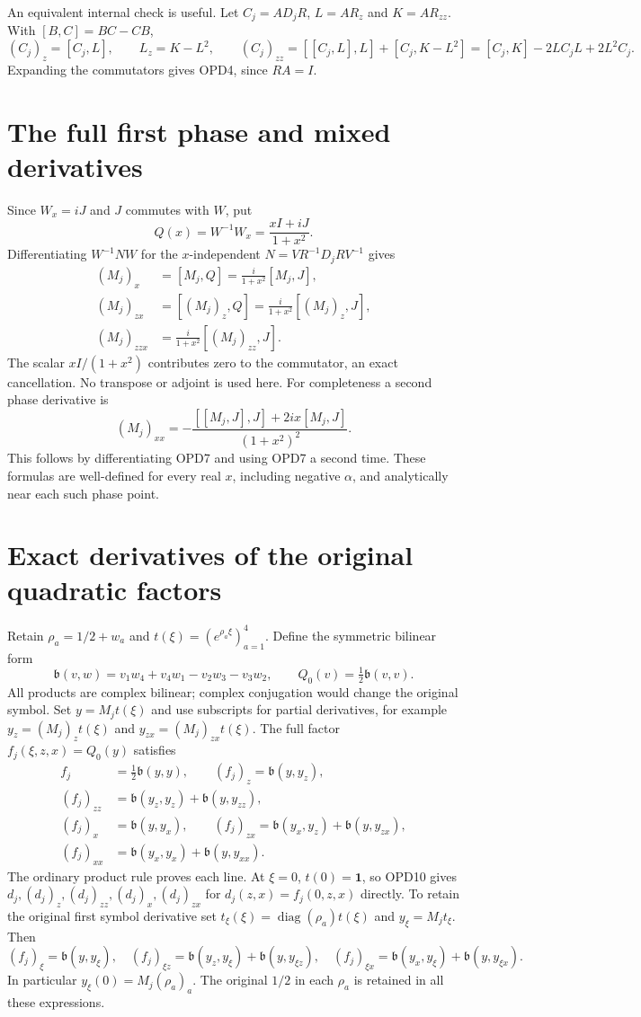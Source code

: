 \documentclass[11pt]{article}
\newcommand{\diag}{\operatorname{diag}}
\begin{document}
An equivalent internal check is useful. Let $C_j=AD_jR$,
$L=AR_z$ and $K=AR_{zz}$. With $[B,C]=BC-CB$,
\[
 (C_j)_z=[C_j,L],\qquad L_z=K-L^2,\qquad
 (C_j)_{zz}=[[C_j,L],L]+[C_j,K-L^2]
 =[C_j,K]-2LC_jL+2L^2C_j.
 \tag{OPD5}
\]
Expanding the commutators gives OPD4, since $RA=I$.

\section{The full first phase and mixed derivatives}
Since $W_x=iJ$ and $J$ commutes with $W$, put
\[
 Q(x)=W^{-1}W_x=\frac{xI+iJ}{1+x^2}.
 \tag{OPD6}
\]
Differentiating $W^{-1}NW$ for the $x$-independent
$N=VR^{-1}D_jRV^{-1}$ gives
\[
 \begin{split}
 (M_j)_x&=[M_j,Q]=\frac{i}{1+x^2}[M_j,J],\\
 (M_j)_{zx}&=[(M_j)_z,Q]
                =\frac{i}{1+x^2}[(M_j)_z,J],\\
 (M_j)_{zzx}&=\frac{i}{1+x^2}[(M_j)_{zz},J].
 \end{split}\tag{OPD7}
\]
The scalar $xI/(1+x^2)$ contributes zero to the commutator,
an exact cancellation. No transpose or adjoint is used here.
For completeness a second phase derivative is
\[
 (M_j)_{xx}=
 -\frac{[[M_j,J],J]+2ix[M_j,J]}{(1+x^2)^2}.
 \tag{OPD8}
\]
This follows by differentiating OPD7 and using OPD7 a second time.
These formulas are well-defined for every real $x$, including
negative $\alpha$, and analytically near each such phase point.

\section{Exact derivatives of the original quadratic factors}
Retain $\rho_a=1/2+w_a$ and $t(\xi)=(e^{\rho_a\xi})_{a=1}^4$.
Define the symmetric bilinear form
\[
 \mathfrak b(v,w)=v_1w_4+v_4w_1-v_2w_3-v_3w_2,
 \qquad Q_0(v)=\tfrac12\mathfrak b(v,v).
 \tag{OPD9}
\]
All products are complex bilinear; complex conjugation would change
the original symbol. Set $y=M_jt(\xi)$ and use subscripts for
partial derivatives, for example $y_z=(M_j)_zt(\xi)$ and
$y_{zx}=(M_j)_{zx}t(\xi)$. The full factor
$f_j(\xi,z,x)=Q_0(y)$ satisfies
\[
 \begin{split}
 f_j&=\tfrac12\mathfrak b(y,y),\qquad
 (f_j)_z=\mathfrak b(y,y_z),\\
 (f_j)_{zz}&=\mathfrak b(y_z,y_z)+\mathfrak b(y,y_{zz}),\\
 (f_j)_x&=\mathfrak b(y,y_x),\qquad
 (f_j)_{zx}=\mathfrak b(y_x,y_z)+\mathfrak b(y,y_{zx}),\\
 (f_j)_{xx}&=\mathfrak b(y_x,y_x)+\mathfrak b(y,y_{xx}).
 \end{split}\tag{OPD10}
\]
The ordinary product rule proves each line. At $\xi=0$,
$t(0)=\mathbf1$, so OPD10 gives $d_j,(d_j)_z,(d_j)_{zz},
(d_j)_x,(d_j)_{zx}$ for $d_j(z,x)=f_j(0,z,x)$ directly.
To retain the original first symbol derivative set
$t_\xi(\xi)=\diag(\rho_a)t(\xi)$ and $y_\xi=M_jt_\xi$.
Then
\[
 (f_j)_\xi=\mathfrak b(y,y_\xi),\quad
 (f_j)_{\xi z}=\mathfrak b(y_z,y_\xi)+\mathfrak b(y,y_{\xi z}),
 \quad
 (f_j)_{\xi x}=\mathfrak b(y_x,y_\xi)+\mathfrak b(y,y_{\xi x}).
 \tag{OPD11}
\]
In particular $y_\xi(0)=M_j(\rho_a)_a$. The original $1/2$
in each $\rho_a$ is retained in all these expressions.
\end{document}

